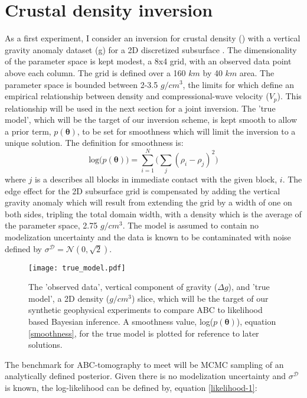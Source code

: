 \section{Crustal density inversion}

As a first experiment, I consider an inversion for crustal density (\rho) with a vertical gravity anomaly dataset (\Delta g) for a 2D discretized subsurface \citep[p.184-195,378]{blakely1996}. The dimensionality of the parameter space is kept modest, a 8x4 grid, with an observed data point above each column. The grid is defined over a 160 $km$ by 40 $km$ area. The parameter space is bounded between 2-3.5 $g/cm^3$, the limits for which \citet{Brocher2005} define an empirical relationship between density and compressional-wave velocity ($V_p$). This relationship will be used in the next section for a joint inversion. The 'true model', which will be the target of our inversion scheme, is kept smooth to allow a prior term, $p(\bm{\theta})$, to be set for smoothness which will limit the inversion to a unique solution. The definition for smoothness is:
\begin{equation}
\text{log}\big(p(\bm{\theta})\big) = \sum_{i = 1}^{N} \Big(\sum_{j} (\rho_i - \rho_j)^2\Big)
\label{smoothness}
\end{equation}
where $j$ is a describes all blocks in immediate contact with the given block, $i$. The edge effect for the 2D subsurface grid is compensated by adding the vertical gravity anomaly which will result from extending the grid by a width of one on both sides, tripling the total domain width, with a density which is the average of the parameter space, 2.75 $g/cm^3$. The model is assumed to contain no modelization uncertainty and the data is known to be contaminated with noise defined by $\sigma^{\mathcal{D}} = \mathcal{N}(0,\sqrt{2})$.
\begin{figure}[H]
	\centering
	\texttt{[image: true\_model.pdf]}
	\caption{The 'observed data', vertical component of gravity ($\Delta g$), and 'true model', a 2D density ($g/cm^3$) slice, which will be the target of our synthetic geophysical experiments to compare ABC to likelihood based Bayesian inference. A smoothness value, log($p(\bm{\theta})$), equation \ref{smoothness}, for the true model is plotted for reference to later solutions.}
	\label{true_model}
\end{figure}
The benchmark for ABC-tomography to meet will be MCMC sampling of an analytically defined posterior. Given there is no modelization uncertainty and $\sigma^{\mathcal{D}}$ is known, the log-likelihood can be defined by, equation \ref{likelihood-1}:
